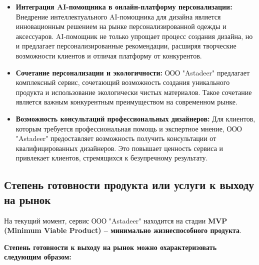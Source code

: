 \begin{itemize}
    \item \textbf{Интеграция AI-помощника в онлайн-платформу персонализации:}  Внедрение интеллектуального AI-помощника для дизайна является инновационным решением на рынке персонализированной одежды и аксессуаров.  AI-помощник не только упрощает процесс создания дизайна, но и предлагает персонализированные рекомендации, расширяя творческие возможности клиентов и отличая платформу от конкурентов.
    \item \textbf{Сочетание персонализации и экологичности:}  ООО "Astadeer" предлагает комплексный сервис, сочетающий возможность создания уникального продукта и использование экологически чистых материалов.  Такое сочетание является важным конкурентным преимуществом на современном рынке.
    \item \textbf{Возможность консультаций профессиональных дизайнеров:}  Для клиентов, которым требуется профессиональная помощь и экспертное мнение, ООО "Astadeer" предоставляет возможность получить консультации от квалифицированных дизайнеров. Это повышает ценность сервиса и привлекает клиентов, стремящихся к безупречному результату.
\end{itemize}

\subsection{Степень готовности продукта или услуги к выходу на рынок}

На текущий момент, сервис ООО "Astadeer" находится на стадии \textbf{MVP (Minimum Viable Product) – минимально жизнеспособного продукта}.

\vspace{0.3cm}

\textbf{Степень готовности к выходу на рынок можно охарактеризовать следующим образом:}

